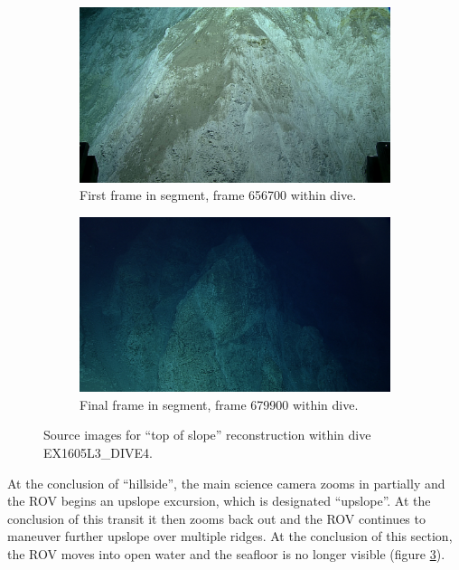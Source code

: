 \documentclass[letterpaper,12pt]{article}
\begin{document}
\begin{figure}
    \centering
    \begin{subfigure}[b]{0.48\textwidth}
        \includegraphics[width=\textwidth]{images/image_656700.png}
        \caption{First frame in segment, frame 656700 within dive.}
        \label{fig:ex1605l3_dive4_top_of_slope_begin}
    \end{subfigure}
    \begin{subfigure}[b]{0.48\textwidth}
        \includegraphics[width=\textwidth]{images/image_679900.png}
        \caption{Final frame in segment, frame 679900 within dive.}
        \label{fig:ex1605l3_dive4_top_of_slope_end}
    \end{subfigure}
    \caption{Source images for ``top of slope'' reconstruction within dive EX1605L3\_DIVE4.}
\end{figure}

At the conclusion of ``hillside'', the main science camera zooms in partially and the ROV begins an upslope excursion, which is designated ``upslope''.  At the conclusion of this transit it then zooms back out and the ROV continues to maneuver further upslope over multiple ridges.  At the conclusion of this section, the ROV moves into open water and the seafloor is no longer visible (figure \ref{fig:ex1605l3_dive4_top_of_slope_end}).
\end{document}
